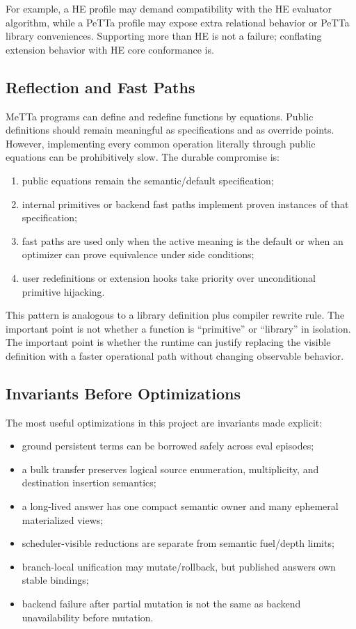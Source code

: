 \documentclass[11pt]{article}
\newcommand{\MeTTa}{MeTTa}
\newcommand{\PeTTa}{PeTTa}
\newcommand{\HE}{HE}
\begin{document}
For example, a \HE{} profile may demand compatibility with the \HE{} evaluator algorithm, while a \PeTTa{} profile may expose extra relational behavior or \PeTTa{} library conveniences.  Supporting more than \HE{} is not a failure; conflating extension behavior with \HE{} core conformance is.

\subsection{Reflection and Fast Paths}

\MeTTa{} programs can define and redefine functions by equations.  Public definitions should remain meaningful as specifications and as override points.  However, implementing every common operation literally through public equations can be prohibitively slow.  The durable compromise is:

\begin{enumerate}[leftmargin=*]
  \item public equations remain the semantic/default specification;
  \item internal primitives or backend fast paths implement proven instances of that specification;
  \item fast paths are used only when the active meaning is the default or when an optimizer can prove equivalence under side conditions;
  \item user redefinitions or extension hooks take priority over unconditional primitive hijacking.
\end{enumerate}

This pattern is analogous to a library definition plus compiler rewrite rule.  The important point is not whether a function is ``primitive'' or ``library'' in isolation.  The important point is whether the runtime can justify replacing the visible definition with a faster operational path without changing observable behavior.

\subsection{Invariants Before Optimizations}

The most useful optimizations in this project are invariants made explicit:

\begin{itemize}[leftmargin=*]
  \item ground persistent terms can be borrowed safely across eval episodes;
  \item a bulk transfer preserves logical source enumeration, multiplicity, and destination insertion semantics;
  \item a long-lived answer has one compact semantic owner and many ephemeral materialized views;
  \item scheduler-visible reductions are separate from semantic fuel/depth limits;
  \item branch-local unification may mutate/rollback, but published answers own stable bindings;
  \item backend failure after partial mutation is not the same as backend unavailability before mutation.
\end{itemize}
\end{document}
